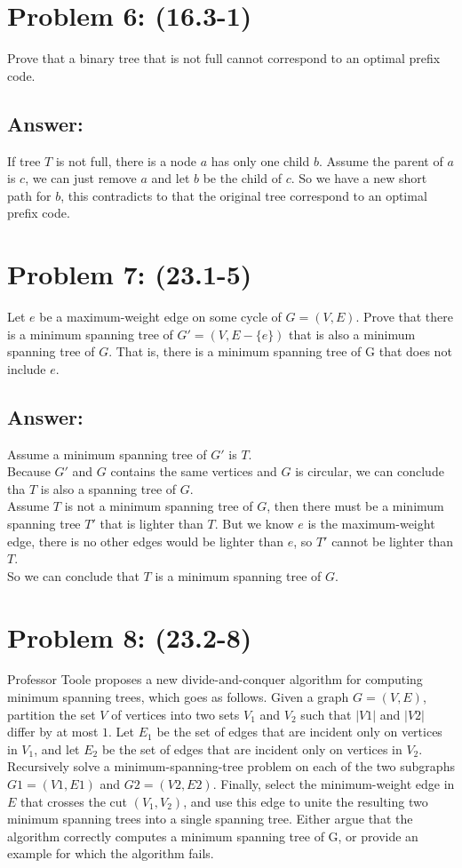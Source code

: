 \documentclass[a4paper]{article}
\begin{document}
\section*{Problem 6: (16.3-1)} Prove that a binary tree that is not full cannot correspond to an optimal prefix code.
\subsection*{Answer:}
If tree $T$ is not full, there is a node $a$ has only one child $b$. Assume the parent of $a$ is $c$, we can just remove $a$ and let $b$ be the child of $c$. So we have a new short path for $b$, this contradicts to that the original tree correspond to an optimal prefix code.

\section*{Problem 7: (23.1-5)} Let $e$ be a maximum-weight edge on some cycle of $G = (V, E)$. Prove that there is a minimum spanning tree of $G' = (V, E -\{e\})$ that is also a minimum spanning tree of $G$. That is, there is a minimum spanning tree of G that does not include $e$.
\subsection*{Answer:}
Assume a minimum spanning tree of $G'$ is $T$.\\
Because $G'$ and $G$ contains the same vertices and $G$ is circular, we can conclude tha $T$ is also a spanning tree of $G$.\\
Assume $T$ is not a minimum spanning tree of $G$, then there must be a minimum spanning tree $T'$ that is lighter than $T$. But we know $e$ is the maximum-weight edge, there is no other edges would be lighter than $e$, so $T'$ cannot be lighter than $T$.\\
So we can conclude that $T$ is a  minimum spanning tree of $G$.

\section*{Problem 8: (23.2-8)} Professor Toole proposes a new divide-and-conquer algorithm for computing minimum spanning trees, which goes as follows. Given a graph $G = (V, E)$, partition the set $V$ of vertices into two sets $V_1$ and $V_2$ such that $|V1|$ and $|V2|$ differ by at most $1$. Let $E_1$ be the set of edges that are incident only on vertices in $V_1$, and let $E_2$ be the set of edges that are incident only on vertices in $V_2$. Recursively solve a minimum-spanning-tree problem on each of the two subgraphs $G1 = (V1, E1)$ and $G2 = (V2, E2)$. Finally, select the minimum-weight edge in $E$ that crosses the cut $(V_1, V_2)$, and use this edge to unite the resulting two minimum spanning trees into a single spanning tree. Either argue that the algorithm correctly computes a minimum spanning tree of G, or provide an example for which the algorithm fails.
\end{document}
